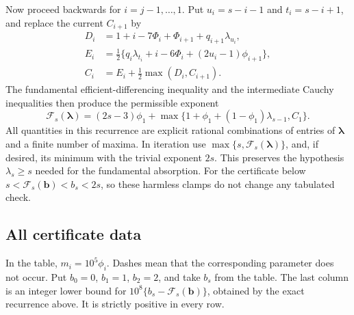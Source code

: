 \documentclass[11pt,reqno]{amsart}
\numberwithin{equation}{section}
\theoremstyle{definition}
\begin{document}
Now proceed backwards for $i=j-1,\ldots,1$.  Put $u_i=s-i-1$ and
$t_i=s-i+1$, and replace the current $C_{i+1}$ by
\begin{align*}
 D_i&=1+i-7\Phi_i+\Phi_{i+1}+q_{i+1}\lambda_{u_i},\\
 E_i&=\tfrac12\{q_i\lambda_{t_i}+i-6\Phi_i
                       +(2u_i-1)\phi_{i+1}\},\\
 C_i&=E_i+\tfrac12\max(D_i,C_{i+1}).
\end{align*}
The fundamental efficient-differencing inequality and the intermediate
Cauchy inequalities then produce the permissible exponent
\begin{equation}\label{eq:g7-map}
 \mathcal F_s(\boldsymbol\lambda)
  =(2s-3)\phi_1+
       \max\{1+\phi_1+(1-\phi_1)\lambda_{s-1},C_1\}.
\end{equation}
All quantities in this recurrence are explicit rational combinations of
entries of $\boldsymbol\lambda$ and a finite number of maxima.
In iteration use $\max\{s,\mathcal F_s(\boldsymbol\lambda)\}$, and,
if desired, its minimum with the trivial exponent $2s$.  This preserves
the hypothesis $\lambda_s\ge s$ needed for the fundamental absorption.
For the certificate below $s<\mathcal F_s(\boldsymbol b)<b_s<2s$,
so these harmless clamps do not change any tabulated check.

\subsection{All certificate data}

In the table, $m_i=10^5\phi_i$.  Dashes mean that the corresponding parameter
does not occur.  Put $b_0=0$, $b_1=1$, $b_2=2$, and take $b_s$ from the table.
The last column is an integer lower bound for
$10^8\{b_s-\mathcal F_s(\boldsymbol b)\}$, obtained by the exact recurrence
above.  It is strictly positive in every row.
\end{document}
